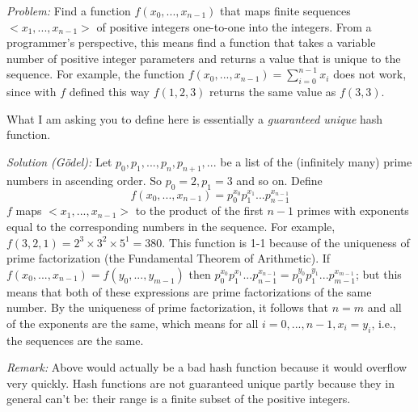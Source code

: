 \documentclass[11pt,a4paper]{report}
\theoremstyle{plain}
\theoremstyle{definition}
\theoremstyle{remark}
\begin{document}
\textit{Problem:} Find a function $f(x_0, ..., x_{n-1})$ that maps finite sequences $<x_1, ..., x_{n-1}>$ of positive integers one-to-one into the integers.  From a programmer's perspective, this means find a function that takes a variable number of positive integer parameters and returns a value that is unique to the sequence.  For example, the function $f(x_0, ..., x_{n-1}) = \sum_{i=0}^{n-1}{x_i}$ does not work, since with $f$ defined this way $f(1,2,3)$ returns the same value as $f(3,3)$.

What I am asking you to define here is essentially a \textit{guaranteed unique} hash function.

\textit{Solution (Gödel):} Let $p_0, p_1, ..., p_n, p_{n+1}, ...$ be a list of the (infinitely many) prime numbers in ascending order.  So $p_0 = 2, p_1 = 3$ and so on.  Define 
$$f(x_0, ..., x_{n-1}) = p_0^{x_0}p_1^{x_1}...p_{n-1}^{x_{n-1}}$$
$f$ maps $<x_1, ..., x_{n-1}>$ to the product of the first $n-1$ primes with exponents equal to the corresponding numbers in the sequence.  For example, $f(3,2,1) = 2^{3} \times 3^{2} \times 5^{1} = 380.$
This function is 1-1 because of the uniqueness of prime factorization (the Fundamental Theorem of Arithmetic).  If $f(x_0, ..., x_{n-1}) = f(y_0, ..., y_{m-1})$ then $p_0^{x_0}p_1^{x_1}...p_{n-1}^{x_{n-1}} = p_0^{y_0}p_1^{y_1}...p_{m-1}^{x_{m-1}}$; but this means that both of these expressions are prime factorizations of the same number.  By the uniqueness of prime factorization, it follows that $n = m$ and all of the exponents are the same, which means for all $i = 0, ..., n-1, x_i = y_i$, i.e., the sequences are the same.

\textit{Remark:} Above would actually be a bad hash function because it would overflow very quickly. Hash functions are not guaranteed unique partly because they in general can't be: their range is a finite subset of the positive integers.
\end{document}
